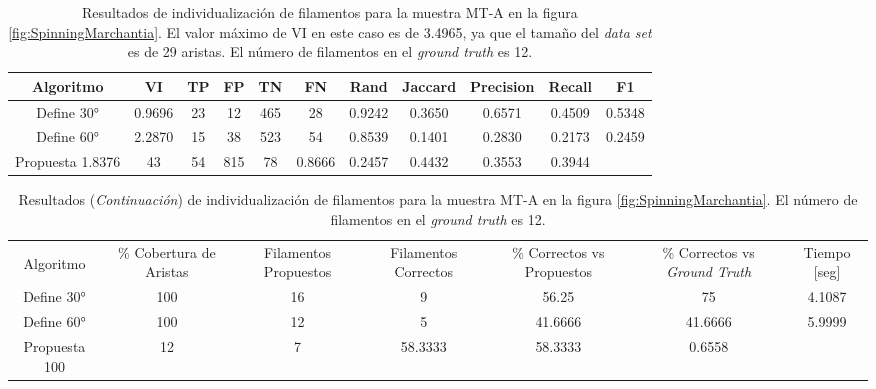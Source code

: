 \begin{table}[t]
    \centering
    \begin{tabular}{|c|c|c|c|c|c|c|c|c|c|c|}
    \hline
        Algoritmo & VI & TP & FP &TN &FN & Rand	& Jaccard &	Precision &	Recall &	F1 \\ \hline
        Define 30° & 0.9696 & 23 & 12 & 465 & 28 & 0.9242 & 0.3650 & 0.6571 & 0.4509  & 0.5348 \\ 
        Define 60° & 2.2870  & 15 & 38 & 523 & 54 & 0.8539 & 0.1401 & 0.2830 & 0.2173 & 0.2459\\
        Propuesta 1.8376 & 43 & 54 & 815 & 78 & 0.8666 & 0.2457 & 0.4432 & 0.3553 & 0.3944 \\
        \hline
    \end{tabular}
    \caption{Resultados de individualizaci\'on de filamentos para la muestra MT-A en la figura \ref{fig:SpinningMarchantia}. El valor m\'aximo de VI en este caso es de 3.4965, ya que el tama\~no del {\it data set} es de 29 aristas. El n\'umero de filamentos en el {\it ground truth} es 12.}
    \label{tab:SpinningMarchantiaResults1}
\end{table}
\addtocounter{table}{-1}
\begin{table}[h]
    \centering
    \begin{tabular}{|c|c|c|c|c|c|c|}
    \hline
         & \multirow{4}{2cm}{\centering \% Cobertura de Aristas} & \multirow{4}{2cm}{Filamentos Propuestos} & \multirow{4}{2cm}{Filamentos Correctos} & \multirow{4}{2.5cm}{\% Correctos vs Propuestos} & \multirow{4}{2.5cm}{\centering \% Correctos vs {\it Ground Truth}} & \multirow{4}{1.2cm}{\centering Tiempo [seg]} \\
         &  &  &  & & &  \\
        Algoritmo &  &  &  & & &  \\
        &  &  &  & & &  \\ \hline
        Define 30° & 100 & 16 & 9 & 56.25       & 75          & 4.1087 \\
        Define 60° & 100 & 12 & 5 & 41.6666 & 41.6666 & 5.9999 \\ 
        Propuesta 100 & 12 & 7 & 58.3333 & 58.3333 & 0.6558 \\
        \hline
    \end{tabular}
    \caption{Resultados ({\it Continuaci\'on}) de individualizaci\'on de filamentos para la muestra MT-A en la figura \ref{fig:SpinningMarchantia}. El n\'umero de filamentos en el {\it ground truth} es 12.}
\end{table}


